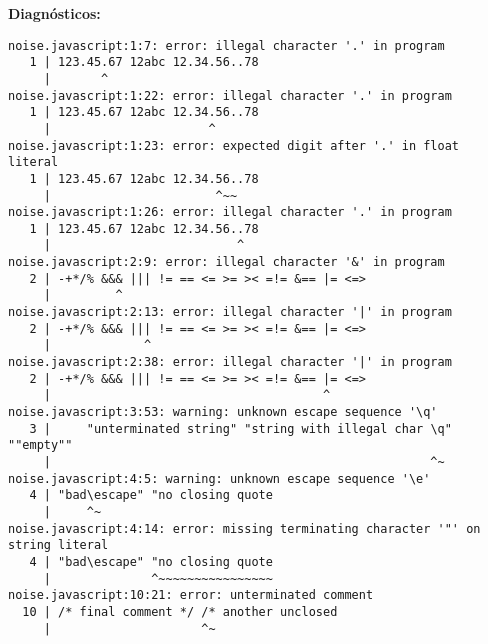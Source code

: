 \documentclass[a4paper]{CSMakotoTechnicalReport}
\begin{document}
\begin{appendices}
\begin{description}
            \textbf{Diagnósticos:}
            \begin{lstlisting}
noise.javascript:1:7: error: illegal character '.' in program
   1 | 123.45.67 12abc 12.34.56..78
     |       ^
noise.javascript:1:22: error: illegal character '.' in program
   1 | 123.45.67 12abc 12.34.56..78
     |                      ^
noise.javascript:1:23: error: expected digit after '.' in float literal
   1 | 123.45.67 12abc 12.34.56..78
     |                       ^~~
noise.javascript:1:26: error: illegal character '.' in program
   1 | 123.45.67 12abc 12.34.56..78
     |                          ^
noise.javascript:2:9: error: illegal character '&' in program
   2 | -+*/% &&& ||| != == <= >= >< =!= &== |= <=>
     |         ^
noise.javascript:2:13: error: illegal character '|' in program
   2 | -+*/% &&& ||| != == <= >= >< =!= &== |= <=>
     |             ^
noise.javascript:2:38: error: illegal character '|' in program
   2 | -+*/% &&& ||| != == <= >= >< =!= &== |= <=>
     |                                      ^
noise.javascript:3:53: warning: unknown escape sequence '\q'
   3 |     "unterminated string" "string with illegal char \q" ""empty""
     |                                                     ^~
noise.javascript:4:5: warning: unknown escape sequence '\e'
   4 | "bad\escape" "no closing quote
     |     ^~
noise.javascript:4:14: error: missing terminating character '"' on string literal
   4 | "bad\escape" "no closing quote
     |              ^~~~~~~~~~~~~~~~~
noise.javascript:10:21: error: unterminated comment
  10 | /* final comment */ /* another unclosed
     |                     ^~
            \end{lstlisting}
    \end{description}

\end{appendices}

\end{document}
